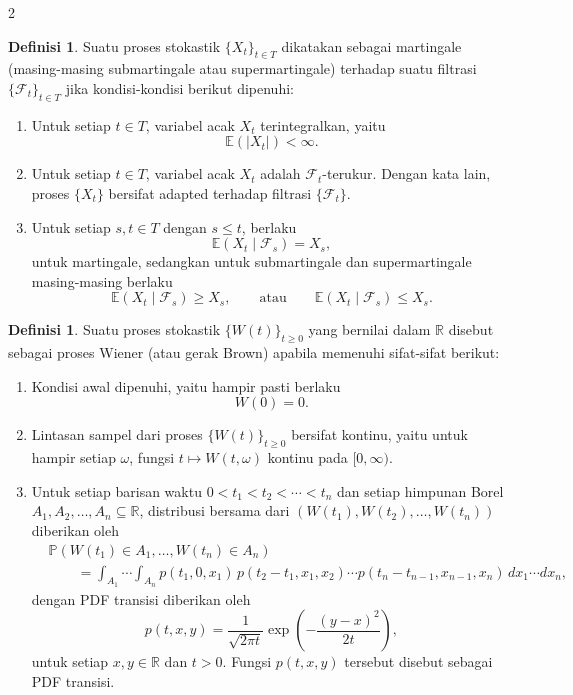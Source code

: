 \documentclass[a4paper,extrafontsizes, 9pt]{memoir}
\theoremstyle{definition}
\newtheorem{definisi}[kalstok]{Definisi}
\theoremstyle{plain}
\theoremstyle{remark}
\begin{document}
\begin{multicols}{2}
  \begin{definisi}
    Suatu proses stokastik $\{X_t\}_{t\in T}$ dikatakan sebagai martingale
    (masing-masing submartingale atau supermartingale) terhadap suatu filtrasi
    $\{\mathcal{F}_t\}_{t\in T}$ jika kondisi-kondisi berikut dipenuhi:
    \begin{enumerate}[leftmargin=*, itemsep=0.5mm]
      \item Untuk setiap $t\in T$, variabel acak $X_t$ terintegralkan, yaitu
            \[\mathbb{E}(|X_t|)<\infty.\]
      \item Untuk setiap $t\in T$, variabel acak $X_t$ adalah $\mathcal{F}_t$-terukur. Dengan
            kata lain, proses $\{X_t\}$ bersifat adapted terhadap filtrasi $\{\mathcal{F}_t\}$.
      \item Untuk setiap $s,t\in T$ dengan $s\le t$, berlaku
            \[\mathbb{E}(X_t\mid\mathcal{F}_s)=X_s,\]
            untuk martingale, sedangkan untuk submartingale dan supermartingale masing-masing
            berlaku
            \[\mathbb{E}(X_t\mid\mathcal{F}_s)\ge X_s,\qquad
              \text{atau}\qquad \mathbb{E}(X_t\mid\mathcal{F}_s)\le X_s.\]
    \end{enumerate}
  \end{definisi}

  \begin{definisi}
    Suatu proses stokastik $\{W(t)\}_{t\ge 0}$ yang bernilai dalam $\mathbb{R}$ disebut sebagai
    proses Wiener (atau gerak Brown) apabila memenuhi sifat-sifat berikut:
    \begin{enumerate}[leftmargin=*, itemsep=0.5mm]
      \item Kondisi awal dipenuhi, yaitu hampir pasti berlaku
            \[W(0)=0.\]
      \item Lintasan sampel dari proses $\{W(t)\}_{t\ge 0}$ bersifat kontinu, yaitu untuk hampir
            setiap $\omega$, fungsi $t\mapsto W(t,\omega)$ kontinu pada $[0,\infty)$.
      \item Untuk setiap barisan waktu $0<t_1<t_2<\cdots<t_n$ dan setiap himpunan Borel
            $A_1,A_2,\ldots,A_n\subseteq\mathbb{R}$, distribusi bersama dari
            $(W(t_1),W(t_2),\ldots,W(t_n))$ diberikan oleh
            \begin{align*}
               & \mathbb{P}(W(t_1)\in A_1,\ldots,W(t_n)\in A_n) \\
               & \qquad =\int_{A_1}\cdots\int_{A_n}
              p(t_1,0,x_1)\,p(t_2-t_1,x_1,x_2)\cdots p(t_n-t_{n-1},x_{n-1},x_n)\,
              dx_1\cdots dx_n,
            \end{align*}
            dengan PDF transisi diberikan oleh
            \[p(t,x,y)=\frac{1}{\sqrt{2\pi t}}
              \exp\!\left(-\frac{(y-x)^2}{2t}\right),\]
            untuk setiap $x,y\in\mathbb{R}$ dan $t>0$. Fungsi $p(t,x,y)$ tersebut disebut
            sebagai PDF transisi.
    \end{enumerate}
  \end{definisi}


\end{multicols}
\end{document}
